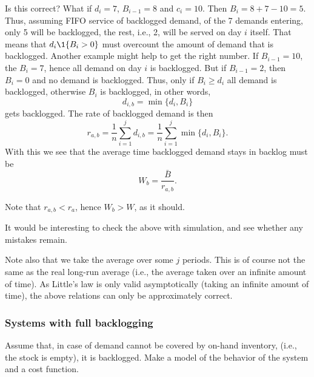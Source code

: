 \begin{solution}
    Is this correct? What if $d_i=7$, $B_{i-1}=8$ and $c_i= 10$. Then
    $B_{i} = 8+7-10 = 5$. Thus, assuming FIFO service of backlogged
    demand, of the 7 demands entering, only 5 will be backlogged, the
    rest, i.e., 2, will be served on day $i$ itself. That means that
    $d_i \1{B_i>0}$ must overcount the amount of demand that is
    backlogged. Another example might help to get the right number. If
    $B_{i-1}=10$, the $B_i=7$, hence all demand on day $i$ is
    backlogged. But if $B_{i-1}=2$, then $B_i = 0$ and no demand is
    backlogged. Thus, only if $B_i\geq d_i$ all demand is backlogged,
    otherwise $B_i$ is backlogged, in other words, 
    \begin{equation*}
      d_{i,b} = \min\{d_i, B_i\}
    \end{equation*}
    gets backlogged. The rate of  backlogged demand is then
    \begin{equation*}
      r_{a,b} =
      \frac 1 n \sum_{i=1}^j d_{i,b} = \frac 1 n \sum_{i=1}^j \min\{d_i, B_i\}.
    \end{equation*}
    With this we see that the average time backlogged demand stays in
    backlog must be
    \begin{equation*}
      W_b  = \frac{\bar B}{r_{a,b}}. 
    \end{equation*}

    Note that $r_{a,b} < r_a$, hence $W_b > W$, as it should.

    It would be interesting to check the above with simulation, and
    see whether any mistakes remain. 

    Note also that we take the average over some $j$ periods. This is
    of course not the same as the real long-run average (i.e., the
    average taken over an infinite amount of time). As Little's law is
    only valid asymptotically (taking an infinite amount of time), the
    above relations can only be approximately correct.
    
  \end{solution}


\subsubsection{Systems with full backlogging}

\begin{question}
  Assume that, in case of demand cannot be covered by on-hand
  inventory, (i.e., the stock is empty), it is backlogged. Make a
  model of the behavior of the system and a cost function.
\end{question}

